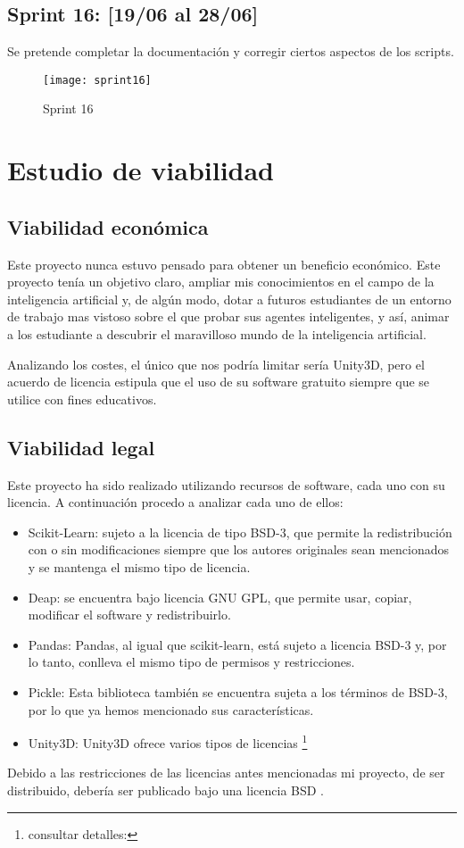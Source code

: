 \subsection{Sprint 16: [19/06 al 28/06]}

Se pretende completar la documentación y corregir ciertos aspectos de los scripts.

\begin{figure}[h!]
    \centering
    \texttt{[image: sprint16]}
    \caption{Sprint 16}
    \label{fig:s16}
\end{figure}


\section{Estudio de viabilidad}

\subsection{Viabilidad económica}
Este proyecto nunca estuvo pensado para obtener un beneficio económico. Este proyecto tenía un objetivo claro, ampliar mis conocimientos en el campo de la inteligencia artificial y, de algún modo, dotar a futuros estudiantes de un entorno de trabajo mas vistoso sobre el que probar sus agentes inteligentes, y así, animar a los estudiante a descubrir el maravilloso mundo de la inteligencia artificial.

Analizando los costes, el único que nos podría limitar sería Unity3D, pero el acuerdo de licencia estipula que el uso de su software gratuito siempre que se utilice con fines educativos.

\subsection{Viabilidad legal}

Este proyecto ha sido realizado utilizando recursos de software, cada uno con su licencia. A continuación procedo a analizar cada uno de ellos:
\begin{itemize}
    \item Scikit-Learn: sujeto a la licencia de tipo BSD-3, que permite la redistribución con o sin modificaciones siempre que los autores originales sean mencionados y se mantenga el mismo tipo de licencia.
    \item Deap: se encuentra bajo licencia GNU GPL, que permite usar, copiar, modificar el software y redistribuirlo.
    \item Pandas: Pandas, al igual que scikit-learn, está sujeto a licencia BSD-3 y, por lo tanto, conlleva el mismo tipo de permisos y restricciones.
    \item Pickle: Esta biblioteca también se encuentra sujeta a los términos de BSD-3, por lo que ya hemos mencionado sus características. 
    \item Unity3D: Unity3D ofrece varios tipos de licencias \footnote{consultar detalles:  }
\end{itemize}


Debido a las restricciones de las licencias antes mencionadas mi proyecto, de ser distribuido, debería ser publicado bajo una licencia BSD \cite{wiki:BSD}.